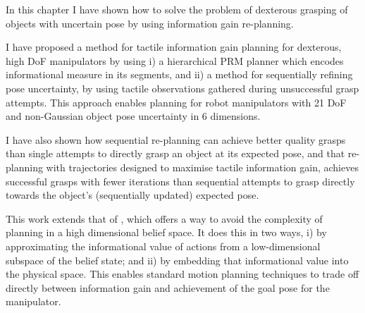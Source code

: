 In this chapter I have shown how to solve the problem of dexterous grasping of objects with uncertain pose by using information gain re-planning.

I have proposed a method for tactile information gain planning for dexterous, high DoF manipulators by using i) a hierarchical PRM planner which encodes informational measure in its segments, and ii)  a method for sequentially refining pose uncertainty, by using tactile observations gathered
during unsuccessful grasp attempts. This approach enables planning for robot manipulators with 21 DoF and non-Gaussian object pose uncertainty in 6 dimensions.

I have also shown how sequential re-planning
can achieve better quality grasps than single attempts to directly grasp an
object at its expected pose, and that re-planning with trajectories
designed to maximise tactile information gain, achieves successful grasps
with fewer iterations than sequential attempts to grasp directly towards
the object's (sequentially updated) expected pose.


This work extends that of \citep{bib:platt_csail_2011}, 
which offers a way to avoid the complexity of planning in a high dimensional belief space. It does
this in two ways, i) by approximating the informational value of
actions from a low-dimensional subspace of the belief state; and
ii) by embedding that informational value into the physical
space. This enables standard motion planning techniques to trade off
directly between information gain and achievement of the goal pose for
the manipulator.

%

